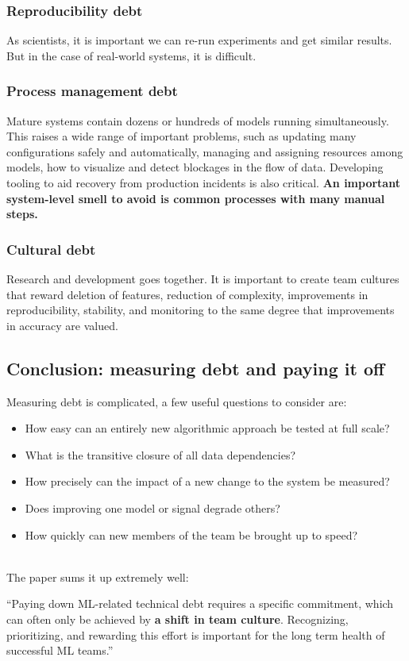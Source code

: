 \documentclass[../main.tex]{subfiles}
\begin{document}
\subsubsection{Reproducibility debt}
As scientists, it is important we can re-run experiments and get similar results. But in the case
of real-world systems, it is difficult.

\subsubsection{Process management debt}
Mature systems contain dozens or hundreds of models running simultaneously. This raises a wide range
of important problems, such as updating many configurations safely and automatically, managing and assigning
resources among models, how to visualize and detect blockages in the flow of data. Developing tooling
to aid recovery from production incidents is also critical. \textbf{An important system-level smell
to avoid is common processes with many manual steps.}

\subsubsection{Cultural debt}
Research and development goes together. It is important to create team cultures that reward deletion
of features, reduction of complexity, improvements in reproducibility, stability, and monitoring to the
same degree that improvements in accuracy are valued.

\subsection{Conclusion: measuring debt and paying it off}
Measuring debt is complicated, a few useful questions to consider are:
\begin{itemize}
    \item How easy can an entirely new algorithmic approach be tested at full scale?
    \item What is the transitive closure of all data dependencies?
    \item How precisely can the impact of a new change to the system be measured?
    \item Does improving one model or signal degrade others?
    \item How quickly can new members of the team be brought up to speed?
\end{itemize}
\\
The paper sums it up extremely well:
\begin{displayquote}
    \enquote{Paying down ML-related technical debt requires a specific commitment, which can often only
        be achieved by \textbf{a shift in team culture}. Recognizing, prioritizing, and rewarding this
        effort is important for the long term health of successful ML teams.}
\end{displayquote}
\end{document}
